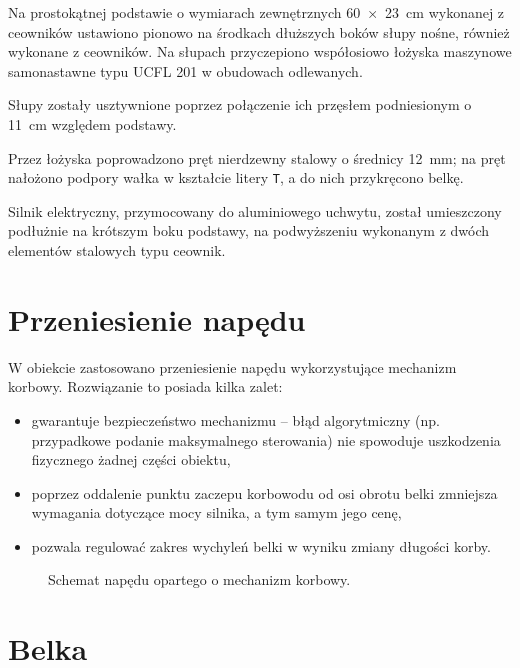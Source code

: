 Na prostokątnej podstawie o wymiarach zewnętrznych \SI[mode=text]{60 x 23}{cm} wykonanej z ceowników ustawiono pionowo na środkach dłuższych boków słupy nośne, również wykonane z ceowników. Na słupach przyczepiono współosiowo łożyska maszynowe samonastawne typu UCFL 201 w obudowach odlewanych.

Słupy zostały usztywnione poprzez połączenie ich przęsłem podniesionym o \SI[mode=text]{11}{cm} względem podstawy.

Przez łożyska poprowadzono pręt nierdzewny stalowy o średnicy \SI[mode=text]{12}{mm}; na pręt nałożono podpory wałka w kształcie litery \texttt{T}, a do nich przykręcono belkę.

Silnik elektryczny, przymocowany do aluminiowego uchwytu, został umieszczony podłużnie na krótszym boku podstawy, na podwyższeniu wykonanym z dwóch elementów stalowych typu ceownik.


\section{Przeniesienie napędu}

W obiekcie zastosowano przeniesienie napędu wykorzystujące mechanizm korbowy. Rozwiązanie to posiada kilka zalet:

\begin{itemize}
	\item gwarantuje bezpieczeństwo mechanizmu -- błąd algorytmiczny (np. przypadkowe podanie maksymalnego sterowania) nie spowoduje uszkodzenia fizycznego żadnej części obiektu,
	\item poprzez oddalenie punktu zaczepu korbowodu od osi obrotu belki zmniejsza wymagania dotyczące mocy silnika, a tym samym jego cenę,
	\item pozwala regulować zakres wychyleń belki w wyniku zmiany długości korby.
\end{itemize}

\begin{figure}[H]
	\centering
	
	\caption{Schemat napędu opartego o mechanizm korbowy.}
	\label{fig:schemat_korba}
\end{figure}

\section{Belka}

